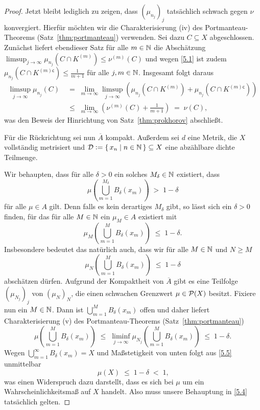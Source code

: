 \documentclass[../main/main.tex]{subfiles}
\begin{document}
\begin{proof}
		Jetzt bleibt lediglich zu zeigen, dass $(\mu_{n_j})_j$ tatsächlich schwach gegen $\nu$ konvergiert. 
		Hierfür möchten wir die Charakterisierung (iv) des Portmanteau-Theorems (Satz~\ref{thm:portmanteau}) verwenden.
		Sei dazu $C \subseteq X$ abgeschlossen. Zunächst liefert ebendieser Satz für alle $m \in \mathbb{N}$ die 
		Abschätzung $\limsup_{j \to \infty} \mu_{n_j}(C \cap K^{(m)}) \leq \nu^{(m)}(C)$ und wegen \eqref{5.1} ist 
		zudem $\mu_{n_j}(C \cap K^{(m) \mathsf{c}}) \leq  \frac{1}{m+1}$ für alle $j, m \in \mathbb{N}$. Insgesamt folgt daraus 
		\begin{align*}
			\limsup_{j \to \infty} \mu_{n_j}(C) \; &=    \; \lim_{m \to \infty} \limsup_{j \to \infty} 
			\left( \mu_{n_j}(C \cap K^{(m)}) + \mu_{n_j}(C \cap K^{(m) \mathsf{c}}) \right) \\
			&\leq \; \lim_{m \to \infty} \left( \nu^{(m)}(C) + \frac{1}{m+1} \right) 
			\; = \; \nu(C) \text{,}
		\end{align*}
		was den Beweis der Hinrichtung von Satz~\ref{thm:prokhorov} abschließt.
		
		Für die Rückrichtung sei nun $\overline{A}$ kompakt. Außerdem sei $d$ eine Metrik, die $X$ vollständig metrisiert 
		und $\mathcal{D} \vcentcolon = \left\{\, x_n \; \middle| \; n \in \mathbb{N} \,\right\} \subseteq X$ eine abzählbare dichte Teilmenge.
		
		Wir behaupten, dass für alle $\delta > 0$ ein solches $M_\delta \in \mathbb{N}$ existiert, dass
		\[ \mu(\bigcup_{m=1}^{M_\delta} B_\delta(x_m)) \; > \; 1 - \delta \label{5.4} \tag{5.4} \]
		für alle $\mu \in A$ gilt. Denn falls es kein derartiges $M_\delta$ gibt, so lässt sich ein $\delta > 0$ finden, für das
		für alle $M \in \mathbb{N}$ ein $\mu_M \in A$ existiert mit
		\[ \mu_M(\bigcup_{m=1}^{M} B_\delta(x_m)) \; \leq \; 1 - \delta \text{.} \]
		Insbesondere bedeutet das natürlich auch, dass wir für alle $M \in \mathbb{N}$ und $N \geq M$ 
		\[ \mu_N(\bigcup_{m=1}^{M} B_\delta(x_m)) \; \leq \; 1 - \delta \]
		abschätzen dürfen. Aufgrund der Kompaktheit von $\overline{A}$ gibt es eine Teilfolge $(\mu_{N_j})_j$ von $(\mu_N)_N$, 
		die einen schwachen Grenzwert $\mu \in \mathcal{P}(X)$ besitzt. Fixiere nun ein $M \in \mathbb{N}$. 
		Dann ist $\bigcup_{m=1}^{M} B_\delta(x_m)$
		offen und daher liefert Charakterisierung (v) des Portmanteau-Theorems (Satz~\ref{thm:portmanteau})
		\[ \mu(\bigcup_{m=1}^{M} B_\delta(x_m)) 
		\; \leq \; \liminf_{j \to \infty} \mu_{N_j}(\bigcup_{m=1}^{M} B_\delta(x_m)) 
		\; \leq \; 1 - \delta \text{.} \label{5.5} \tag{5.5} \]
		Wegen $\bigcup_{m=1}^{\infty} B_\delta(x_m) = X$ und Maßstetigkeit von unten 
		folgt aus \eqref{5.5} unmittelbar 
		\[ \mu(X) \; \leq \; 1 - \delta \; < \; 1 \text{,} \]
		was einen Widerspruch dazu darstellt, dass es sich bei $\mu$ um ein 
		Wahrscheinlichkeitsmaß auf $X$ handelt. Also muss unsere Behauptung in \eqref{5.4} tatsächlich gelten.
		

\end{proof}
\end{document}
